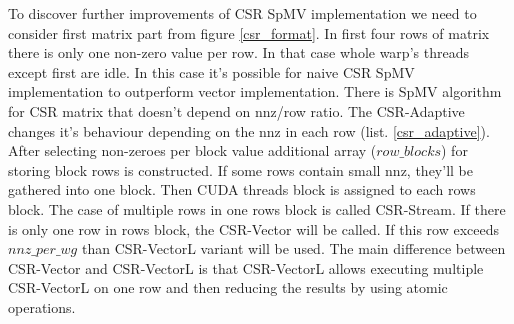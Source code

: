 \documentclass{article}
\begin{document}
\begin{figure}[H]
\centering
{}
\qquad %
\end{figure}

To discover further improvements of CSR SpMV implementation we need to consider first matrix part from figure \ref{csr_format}. In first four rows
of matrix there is only one non-zero value per row. In that case whole warp's threads except first are idle. In this case it's possible
for naive CSR SpMV implementation to outperform vector implementation. There is SpMV algorithm for CSR matrix that doesn't depend on nnz/row ratio.
The CSR-Adaptive changes it's behaviour depending on the nnz in each row (list. \ref{csr_adaptive}). After selecting non-zeroes per block value 
additional array ($row\_blocks$) for storing block rows is constructed. If some rows contain small nnz, they'll be gathered into one block. Then
CUDA threads block is assigned to each rows block. The case of multiple rows in one rows block is called CSR-Stream. If there is only one row
in rows block, the CSR-Vector will be called. If this row exceeds $nnz\_per\_wg$ than CSR-VectorL variant will be used. The main difference between
CSR-Vector and CSR-VectorL is that CSR-VectorL allows executing multiple CSR-VectorL on one row and then reducing the results by using atomic operations.
\end{document}
